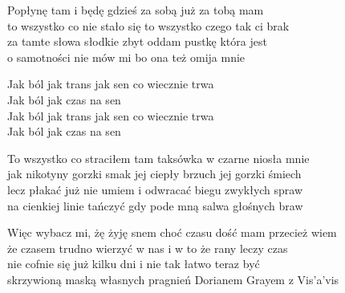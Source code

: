 \begin{text}
    Popłynę tam i będę gdzieś za sobą już za tobą mam\\
    to wszystko co nie stało się to wszystko czego tak ci brak\\
    za tamte słowa słodkie zbyt oddam pustkę która jest\\
    o samotności nie mów mi bo ona też omija mnie

    Jak ból jak trans jak sen co wiecznie trwa\\
    Jak ból jak czas na sen\\
    Jak ból jak trans jak sen co wiecznie trwa\\
    Jak ból jak czas na sen

    To wszystko co straciłem tam taksówka w czarne niosła mnie\\
    jak nikotyny gorzki smak jej ciepły brzuch jej gorzki śmiech\\
    lecz płakać już nie umiem i odwracać biegu zwykłych spraw\\
    na cienkiej linie tańczyć gdy pode mną salwa głośnych braw

    Więc wybacz mi, żę żyję snem choć czasu dość mam przecież wiem\\
    że czasem trudno wierzyć w nas i w to że rany leczy czas\\
    nie cofnie się już kilku dni i nie tak łatwo teraz być\\
    skrzywioną maską własnych pragnień Dorianem Grayem z Vis'a'vis
\end{text}
\begin{chord}

\end{chord}